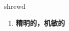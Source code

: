 
\begin{frame}
{\huge shrewd}
\begin{center}
\begin{enumerate}\Large
  \item \textbf{精明的，机敏的}
\end{enumerate}
\end{center}
\end{frame}
